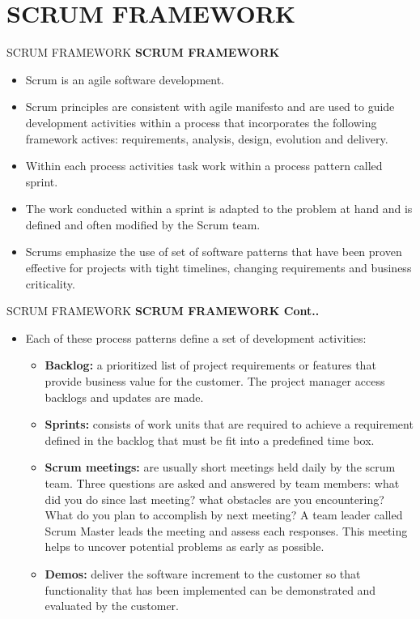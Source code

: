 \documentclass{beamer}
\begin{document}
\section{SCRUM FRAMEWORK}
\begin{frame}{SCRUM FRAMEWORK}
\textbf{SCRUM FRAMEWORK}
\begin{itemize}
	\item Scrum is an agile software development. 
	\item Scrum principles are consistent with agile manifesto and are used to guide development activities 
	within a process that incorporates the following framework actives: requirements, analysis, design, 
	evolution and delivery.
	\item Within each process activities task work within a process pattern called sprint. 
	\item The work conducted within a sprint is adapted to the problem at hand and is defined and often 
	modified by the Scrum team.
	\item Scrums emphasize the use of set of software patterns that have been proven effective for projects with 
	tight timelines, changing requirements and business criticality. 
\end{itemize}
\end{frame}
\begin{frame}{SCRUM FRAMEWORK}
	\textbf{SCRUM FRAMEWORK Cont..}
	\begin{itemize}
		\item Each of these process patterns define a set of development activities:
\begin{itemize}
	\item \textbf{Backlog:} a prioritized list of project requirements or features that provide business value for the 
	customer. The project manager access backlogs and updates are made.
	\item \textbf{Sprints:} consists of work units that are required to achieve a requirement defined in the backlog
	that must be fit into a predefined time box.
	\item \textbf{Scrum meetings:} are usually short meetings held daily by the scrum team. Three questions are 
	asked and answered by team members: what did you do since last meeting? what obstacles are 
	you encountering? What do you plan to accomplish by next meeting? A team leader called Scrum 
	Master leads the meeting and assess each responses. This meeting helps to uncover potential 
	problems as early as possible. 
\item \textbf{Demos:} deliver the software increment to the customer so that functionality that has been 
	implemented can be demonstrated and evaluated by the customer.
\end{itemize}
	\end{itemize}
\end{frame}
\end{document}
